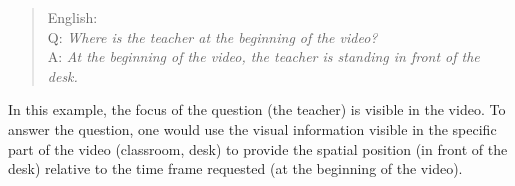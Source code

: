 \begin{itemize}
    \begin{quote}
        English:\\
Q: \textit{Where is the teacher at the beginning of the video?}\\
A: \textit{At the beginning of the video, the teacher is standing in front of the desk.}\\
    \end{quote}
In this example, the focus of the question (the teacher) is visible in the video. To answer the question, one would use the visual information visible in the specific part of the video (classroom, desk) to provide the spatial position (in front of the desk) relative to the time frame requested (at the beginning of the video).
\end{itemize}




